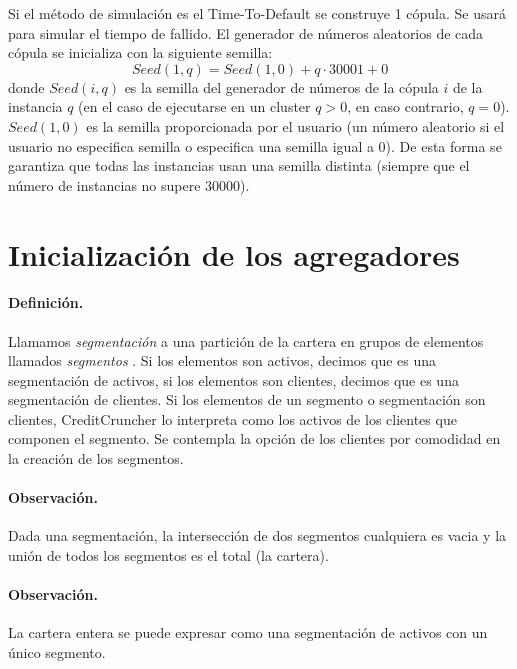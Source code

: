 Si el m\'etodo de simulaci\'on es el Time-To-Default se construye
1 c\'opula. Se usar\'a para simular el tiempo de fallido.
\newline
\newline
El generador de n\'umeros aleatorios de cada c\'opula se
inicializa con la siguiente semilla:
\begin{displaymath}
Seed(1,q) = Seed(1,0) + q \cdot 30001 + 0
\end{displaymath}
donde $Seed(i,q)$ es la semilla del generador de n\'umeros de la
c\'opula $i$ de la instancia $q$ (en el caso de ejecutarse en un
cluster $q>0$, en caso contrario, $q=0$). $Seed(1,0)$ es la semilla
proporcionada por el usuario (un n\'umero aleatorio si el usuario no
especifica semilla o especifica una semilla igual a 0). De esta
forma se garantiza que todas las instancias usan una semilla distinta
(siempre que el n\'umero de instancias no supere 30000).


\section{Inicializaci\'on de los agregadores}

\paragraph{Definici\'on.} Llamamos \emph{segmentaci\'on}
a una partici\'on de la cartera en grupos de elementos llamados \emph{segmentos}
. Si los elementos son activos, decimos que es una segmentaci\'on
de activos, si los elementos son clientes, decimos que es una segmentaci\'on de
clientes. Si los elementos de un segmento o segmentaci\'on son clientes,
CreditCruncher lo interpreta como los activos de los clientes que componen el
segmento. Se contempla la opci\'on de los clientes por comodidad en la
creaci\'on de los segmentos.

\paragraph{Observaci\'on.} Dada una segmentaci\'on, la intersecci\'on
de dos segmentos cualquiera es vacia y la uni\'on de todos los
segmentos es el total (la cartera).

\paragraph{Observaci\'on.} La cartera entera se puede expresar como una
segmentaci\'on de activos con un \'unico segmento.

